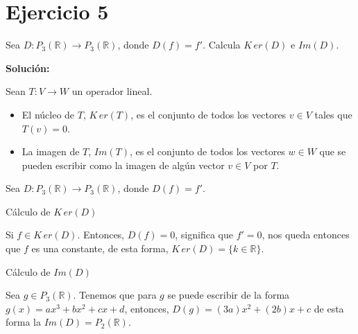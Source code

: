 \section*{Ejercicio 5}

Sea $D : P_{3}(\mathbb{R}) \rightarrow P_{3}(\mathbb{R})$, donde $D(f) = f'$.  Calcula $K\,er(D)$ e $Im(D)$.

    
\noindent \textbf{Solución:}

Sean $T : V \to W$ un operador lineal.
    \begin{itemize}
        \item El núcleo de $T$, $K\,er(T)$, es el conjunto de todos los vectores $v \in V$ tales que $T(v) = 0$.
        \item La imagen de $T$, $Im(T)$, es el conjunto de todos los vectores $w \in W$ que se pueden escribir como la imagen de algún vector $v \in V$ por $T$.
    \end{itemize}
    
Sea $D : P_{3}(\mathbb{R}) \to P_{3}(\mathbb{R})$, donde $D(f) = f'$.
\begin{center}
    Cálculo de $K\,er(D)$
\end{center}
    
Si $f \in K\,er(D)$. Entonces, $D(f) = 0$, significa que $f' = 0$, nos queda entonces que 
$f$ es una constante, de esta forma, $K\,er(D) = \boxed{\{ k \in \mathbb{R} \}}$.
    
\begin{center}
    Cálculo de $Im(D)$
\end{center}
    
Sea $g \in P_{3}(\mathbb{R})$. Tenemos que para $g$ se puede escribir de la forma 
$g(x) = ax^3 + bx^2 + cx + d$, entonces, $D(g) = (3a)x^2 + (2b)x + c$ de esta forma la 
$Im(D) = \boxed{P_{2}(\mathbb{R})}$.

